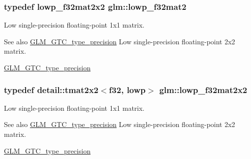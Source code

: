 \subsubsection[{\texorpdfstring{lowp\+\_\+f32mat2}{lowp_f32mat2}}]{\setlength{\rightskip}{0pt plus 5cm}typedef lowp\+\_\+f32mat2x2 {\bf glm\+::lowp\+\_\+f32mat2}}\hypertarget{group__gtc__type__precision_gad717448ef1129d7b795ebcfee6c4944c}{}\label{group__gtc__type__precision_gad717448ef1129d7b795ebcfee6c4944c}
Low single-\/precision floating-\/point 1x1 matrix. \begin{DoxySeeAlso}{See also}
\hyperlink{group__gtc__type__precision}{G\+L\+M\+\_\+\+G\+T\+C\+\_\+type\+\_\+precision} Low single-\/precision floating-\/point 2x2 matrix. 

\hyperlink{group__gtc__type__precision}{G\+L\+M\+\_\+\+G\+T\+C\+\_\+type\+\_\+precision} 
\end{DoxySeeAlso}
\subsubsection[{\texorpdfstring{lowp\+\_\+f32mat2x2}{lowp_f32mat2x2}}]{\setlength{\rightskip}{0pt plus 5cm}typedef detail\+::tmat2x2$<$f32, lowp$>$ {\bf glm\+::lowp\+\_\+f32mat2x2}}\hypertarget{group__gtc__type__precision_gae5beaa9212ba199167c7c7088a70b2bd}{}\label{group__gtc__type__precision_gae5beaa9212ba199167c7c7088a70b2bd}
Low single-\/precision floating-\/point 1x1 matrix. \begin{DoxySeeAlso}{See also}
\hyperlink{group__gtc__type__precision}{G\+L\+M\+\_\+\+G\+T\+C\+\_\+type\+\_\+precision} Low single-\/precision floating-\/point 2x2 matrix. 

\hyperlink{group__gtc__type__precision}{G\+L\+M\+\_\+\+G\+T\+C\+\_\+type\+\_\+precision} 
\end{DoxySeeAlso}
